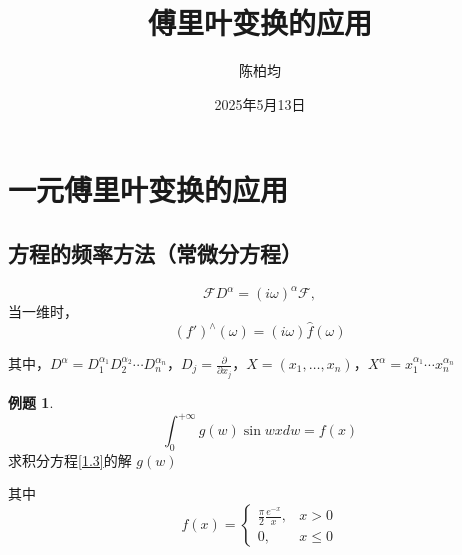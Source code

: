 \documentclass[12pt,a4paper]{article}
\title{傅里叶变换的应用}
\author{陈柏均}
\date{2025年5月13日}
\numberwithin{subsection}{section}   %
\numberwithin{subsubsection}{subsection}
\theoremstyle{plain}
\theoremstyle{definition}
\newtheorem{example}{例题}[subsection]  %
\theoremstyle{remark}
\theoremstyle{remark}
\begin{document}
	\maketitle
	
	\newpage
	
	\tableofcontents  %

	\newpage

\section{一元傅里叶变换的应用}

\subsection{方程的频率方法（常微分方程）}
\begin{equation}
	\mathcal{F} D^\alpha = (i \omega)^\alpha \mathcal{F}, 
\end{equation}
	当一维时，
\begin{equation}
 (f')^\wedge(\omega) = (i \omega) \hat{f}(\omega) 
\end{equation}

其中，\(D^\alpha = D_1^{\alpha_1} D_2^{\alpha_2} \cdots D_n^{\alpha_n}\)，\(D_j = \frac{\partial}{\partial x_j}\)，\(X = (x_1, \ldots, x_n)\)，\(X^\alpha = x_1^{\alpha_1} \cdots x_n^{\alpha_n}\)

\begin{example}
	
		\begin{equation}\label{1.3}
	\int_0^{+\infty} g(w) \sin w x dw = f(x)
		\end{equation}
	求积分方程\eqref{1.3}的解 \(g(w)\)
	
	其中
	\begin{equation}
		f(x) = 
		\begin{cases} 
			\frac{\pi}{2} \frac{e^{-x}}{x}, & x > 0 \\[8pt]
						0, & x \leq 0
		\end{cases}
	\end{equation}
\end{example}
\end{document}
